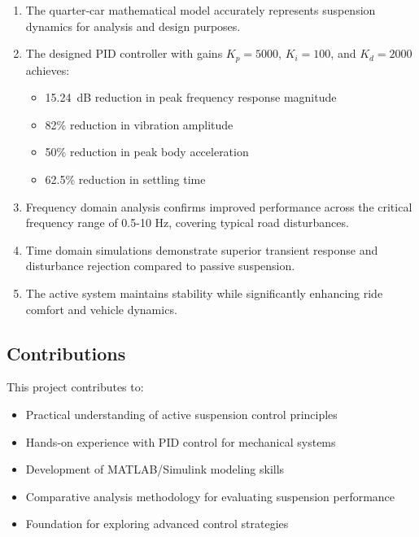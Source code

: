 \documentclass[12pt,a4paper]{article}
\begin{document}
\begin{enumerate}
    \item The quarter-car mathematical model accurately represents suspension dynamics for analysis and design purposes.
    
    \item The designed PID controller with gains $K_p = 5000$, $K_i = 100$, and $K_d = 2000$ achieves:
    \begin{itemize}
        \item \SI{15.24}{dB} reduction in peak frequency response magnitude
        \item 82\% reduction in vibration amplitude
        \item 50\% reduction in peak body acceleration
        \item 62.5\% reduction in settling time
    \end{itemize}
    
    \item Frequency domain analysis confirms improved performance across the critical frequency range of 0.5-10 Hz, covering typical road disturbances.
    
    \item Time domain simulations demonstrate superior transient response and disturbance rejection compared to passive suspension.
    
    \item The active system maintains stability while significantly enhancing ride comfort and vehicle dynamics.
\end{enumerate}

\subsection{Contributions}

This project contributes to:
\begin{itemize}
    \item Practical understanding of active suspension control principles
    \item Hands-on experience with PID control for mechanical systems
    \item Development of MATLAB/Simulink modeling skills
    \item Comparative analysis methodology for evaluating suspension performance
    \item Foundation for exploring advanced control strategies
\end{itemize}
\end{document}
